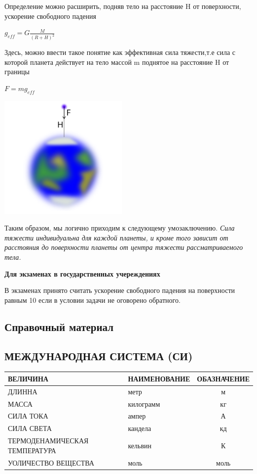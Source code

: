 \documentclass[12pt, letterpaper, twoside]{article}
\begin{document}
Определение можно расширить, подняв тело на расстояние H от поверхности, ускорение свободного падения
\begin{center}
   $g_{eff} = G\frac{M}{(R+H)^2}$
\end{center}

Здесь, можно ввести такое понятие как эффективная сила тяжести,т.е сила с которой планета действует на тело массой m поднятое на расстояние H от границы 
\begin{center}
  $F=mg_{eff}$
\end{center}
\begin{center}
   \qquad \includegraphics{zvt4.png}\\
\end{center}

Таким образом, мы логично приходим к следующему умозаключению. \textit{Сила тяжести индивидуальна для каждой планеты, и кроме того зависит от расстояния до поверхности планеты от центра тяжести рассматриваемого тела.}
\begin{center}
  \textbf{Для экзаменах в государственных учереждениях } 
\end{center}

В экзаменах принято считать ускорение свободного падения на поверхности равным 10  если в условии задачи не оговорено обратного.
\begin{center}
\section{Справочный материал}
\end{center}
\subsection{МЕЖДУНАРОДНАЯ СИСТЕМА (СИ)} 

\begin{tabular}{ || l | l | c || }
\hline
ВЕЛИЧИНА& НАИМЕНОВАНИЕ & ОБАЗНАЧЕНИЕ  \\ \hline
ДЛИННА & метр & м \\ \hline
МАССА & килограмм & кг \\ \hline
СИЛА ТОКА & ампер & А\\ \hline
 СИЛА СВЕТА& кандела & кд \\ \hline
ТЕРМОДЕНАМИЧЕСКАЯ ТЕМПЕРАТУРА& кельвин & К \\ \hline
УОЛИЧЕСТВО ВЕЩЕСТВА& моль & моль \\ \hline
\hline
\end{tabular}
\end{document}
